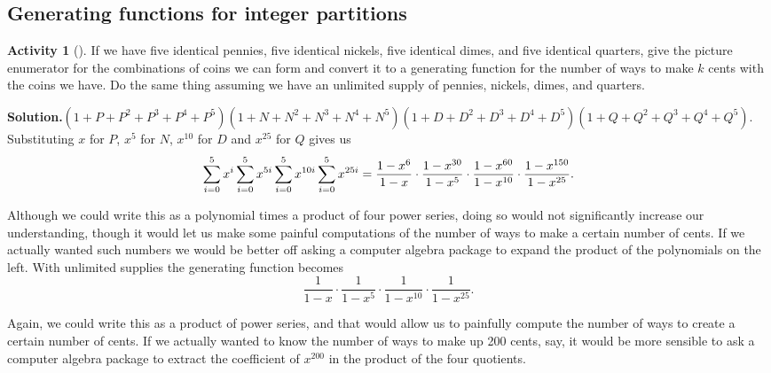 \documentclass[10pt,]{book}
\theoremstyle{plain}
\theoremstyle{definition}
\newtheorem{activity}[project]{Activity}
\numberwithin{equation}{chapter}
\begin{document}
\typeout{************************************************}
\typeout{************************************************}
\subsection[{Generating functions for integer partitions}]{Generating functions for integer partitions}\label{subsection-45}
\begin{activity}[]\label{change-making}
If we have five identical pennies, five identical nickels, five identical dimes, and five identical quarters, give the picture enumerator for the combinations of coins we can form and convert it to a generating function for the number of ways to make \(k\) cents with the coins we have. Do the same thing assuming we have an unlimited supply of pennies, nickels, dimes, and quarters.%
\par\medskip\noindent%
\textbf{Solution.}\quad \((1+P+P^2+P^3+P^4+P^5)(1+N+N^2+N^3+N^4+N^5)(1+D+D^2+D^3+D^4+D^5)
(1+Q+Q^2+Q^3+Q^4+Q^5)\). Substituting \(x\) for \(P\), \(x^5\) for \(N\), \(x^{10}\) for \(D\) and \(x^{25}\) for \(Q\) gives us%
\begin{equation*}
\sum_{i=0}^5x^i\sum_{i=0}^5x^{5i}\sum_{i=0}^5 x^{10i} \sum_{i=0}^5
x^{25i}=\frac{1-x^6}{1-x}\cdot{1-x^{30}\over 1-x^5}\cdot{1-x^{60}\over
1-x^{10}}\cdot{1-x^{150}\over 1-x^{25}}.
\end{equation*}
%
\par
Although we could write this as a polynomial times a product of four power series, doing so would not significantly increase our understanding, though it would let us make some painful computations of the number of ways to make a certain number of cents. If we actually wanted such numbers we would be better off asking a computer algebra package to expand the product of the polynomials on the left. With unlimited supplies the generating function becomes%
\begin{equation*}
\frac{1}{1-x}\cdot\frac{1}{1-x^5}\cdot\frac{1}{1-x^{10}}\cdot\frac{1}{1-x^{25}}.
\end{equation*}
%
\par
Again, we could write this as a product of power series, and that would allow us to painfully compute the number of ways to create a certain number of cents. If we actually wanted to know the number of ways to make up 200 cents, say, it would be more sensible to ask a computer algebra package to extract the coefficient of \(x^{200}\) in the product of the four quotients.%
\end{activity}
\end{document}
